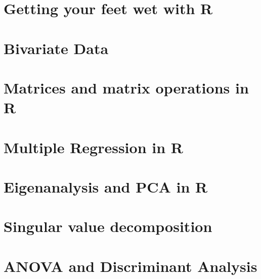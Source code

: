 \documentclass[10pt,oneside,bigheadings,tablecaptionabove]{scrbook}
\begin{document}


\clearscrheadfoot
\pagestyle{scrheadings}

\titleLL
\clearpage
{}


\tableofcontents
\clearpage


\clearscrheadfoot
{}
\ihead{\tikzhead\headmark}
\ohead{\pagemark}
\pagestyle{scrheadings}
\renewcommand*{\chapterpagestyle}{scrheadings}


\chapter{Getting your feet wet with R}


\chapter{Bivariate Data}


\chapter{Matrices and matrix operations in R}


\chapter{Multiple Regression in R}
% 


\chapter{Eigenanalysis and PCA in R}



\chapter{Singular value decomposition}



\chapter{ANOVA and Discriminant Analysis}

\end{document}
